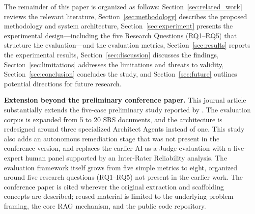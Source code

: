 The remainder of this paper is organized as follows: Section~\ref{sec:related_work} reviews
the relevant literature, Section~\ref{sec:methodology} describes the proposed methodology
and system architecture, Section~\ref{sec:experiment} presents the experimental
design---including the five Research Questions (RQ1--RQ5) that
structure the evaluation---and the evaluation metrics, Section~\ref{sec:results}
reports the experimental results, Section~\ref{sec:discussion} discusses the findings,
Section~\ref{sec:limitations} addresses the limitations and threats to validity, Section~\ref{sec:conclusion}
concludes the study, and Section~\ref{sec:future} outlines potential directions for
future research.

\smallskip\noindent\textbf{Extension beyond the preliminary conference paper.} This journal article substantially extends the five-case preliminary study reported by \cite{dim2026mvc}. The evaluation corpus is expanded from 5 to 20 SRS documents, and the architecture is redesigned around three specialized Architect Agents instead of one. This study also adds an autonomous remediation stage that was not present in the conference version, and replaces the earlier AI-as-a-Judge evaluation with a five-expert human panel supported by an Inter-Rater Reliability analysis. The evaluation framework itself grows from five simple metrics to eight, organized around five research questions (RQ1--RQ5) not present in the earlier work. The conference paper is cited wherever the original extraction and scaffolding concepts are described; reused material is limited to the underlying problem framing, the core RAG mechanism, and the public code repository.